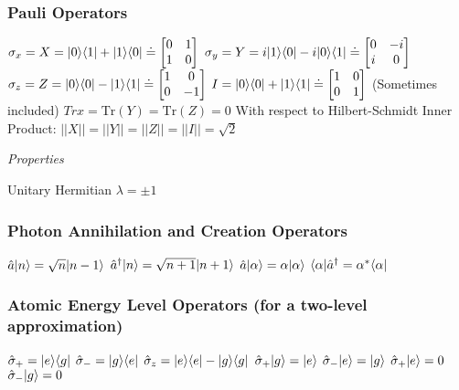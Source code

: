 \subsubsection{Pauli Operators}
\begin{itemize}
\itemt \( \sigma_x = X = \lvert0\rangle\langle1\rvert + \lvert1\rangle\langle0\rvert \doteq 		
\begin{bmatrix}
0 & 1 \\
1 & 0
\end{bmatrix} \)					
\itemt \( \sigma_y = Y = i\lvert1\rangle\langle0\rvert - i\lvert0\rangle\langle1\rvert \doteq 
\begin{bmatrix}
0 & -i \\
i & 0
\end{bmatrix} \)					
\itemt \( \sigma_z = Z = \lvert0\rangle\langle0\rvert - \lvert1\rangle\langle1\rvert \doteq 
\begin{bmatrix}
1 & 0 \\
0 & -1
\end{bmatrix} \)					
\itemt \( I = \lvert0\rangle\langle0\rvert + \lvert1\rangle\langle1\rvert \doteq \begin{bmatrix}
1 & 0 \\
0 & 1
\end{bmatrix} \) (Sometimes included)					
\itemt \( Trx = \mathrm{Tr} (Y) = \mathrm{Tr} (Z) = 0 \)					
\itemt With respect to Hilbert-Schmidt Inner Product:
\subitem \( ||X|| = ||Y|| = ||Z|| = ||I|| = \sqrt{2} \)				
\end{itemize}

\textit{Properties}
\begin{itemize}
\itemt Unitary
\itemt Hermitian
\itemt \( \lambda = \pm 1 \)
\end{itemize}

\subsubsection{Photon Annihilation and Creation Operators}			
\begin{itemize}
\itemt \( \hat{a}\lvert n\rangle = \sqrt{n}\lvert n-1\rangle \)
\itemt \( \hat{a}^\dagger\lvert n\rangle = \sqrt{n+1}\lvert n+1\rangle \)
\itemt \( \hat{a}\lvert\alpha\rangle = \alpha\lvert\alpha\rangle \)
\itemt \( \langle\alpha\rvert\hat{a}^\dagger = \alpha^*\langle\alpha\rvert \)
\end{itemize}

\subsubsection{Atomic Energy Level Operators (for a two-level approximation)}	
\begin{itemize}
\itemt \( \hat{\sigma}_+ = \lvert e\rangle\langle g\rvert \)
\itemt \( \hat{\sigma}_- = \lvert g\rangle\langle e\rvert \)
\itemt \( \hat{\sigma}_z = \lvert e\rangle\langle e\rvert - \lvert g\rangle\langle g\rvert \)
\itemt \( \hat{\sigma}_+\lvert g\rangle = \lvert e\rangle \)
\itemt \( \hat{\sigma}_-\lvert e\rangle = \lvert g\rangle \)
\itemt \( \hat{\sigma}_+\lvert e\rangle = 0 \)
\itemt \( \hat{\sigma}_-\lvert g\rangle = 0 \)
\end{itemize}